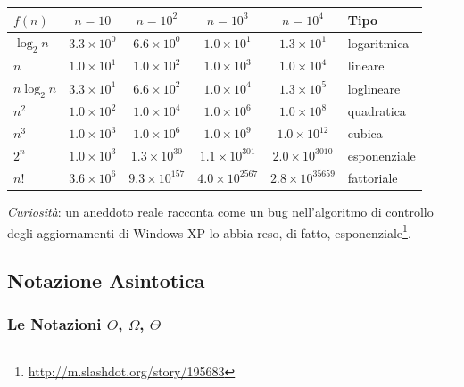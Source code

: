 \documentclass[12pt, a4paper]{article}
\begin{document}
\begin{center}
\begin{tabular}{lccccl}
\toprule
$f(n)$ & $n=10$ & $n=10^2$ & $n=10^3$ & $n=10^4$ & \textbf{Tipo} \\
\midrule
$\log_2 n$   & $3.3\times10^{0}$ & $6.6\times10^{0}$   & $1.0\times10^{1}$    & $1.3\times10^{1}$     & \textcolor{green!50!black}{logaritmica} \\
$n$          & $1.0\times10^{1}$ & $1.0\times10^{2}$   & $1.0\times10^{3}$    & $1.0\times10^{4}$     & \textcolor{green!50!black}{lineare} \\
$n\log_2 n$  & $3.3\times10^{1}$ & $6.6\times10^{2}$   & $1.0\times10^{4}$    & $1.3\times10^{5}$     & \textcolor{green!30!black}{loglineare} \\
$n^2$        & $1.0\times10^{2}$ & $1.0\times10^{4}$   & $1.0\times10^{6}$    & $1.0\times10^{8}$     & \textcolor{orange!80!black}{quadratica} \\
$n^3$        & $1.0\times10^{3}$ & $1.0\times10^{6}$   & $1.0\times10^{9}$    & $1.0\times10^{12}$    & \textcolor{orange!80!black}{cubica} \\
$2^n$        & $1.0\times10^{3}$ & $1.3\times10^{30}$  & $1.1\times10^{301}$  & $2.0\times10^{3010}$  & \textcolor{red!70!black}{esponenziale} \\
$n!$         & $3.6\times10^{6}$ & $9.3\times10^{157}$ & $4.0\times10^{2567}$ & $2.8\times10^{35659}$ & \textcolor{red!70!black}{fattoriale} \\
\bottomrule
\end{tabular}
\end{center}

\textit{Curiosità}: un aneddoto reale racconta come un bug nell'algoritmo di controllo degli aggiornamenti di Windows XP lo abbia reso, di fatto, esponenziale\footnote{\url{http://m.slashdot.org/story/195683}}.



\subsection{Notazione Asintotica}
\label{sec:notazione-asintotica}

\subsubsection{Le Notazioni $O$, $\Omega$, $\Theta$}
\end{document}
